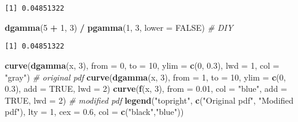\documentclass[]{book}
\newenvironment{Shaded}{\begin{snugshade}}{\end{snugshade}}
\newcommand{\KeywordTok}[1]{\textcolor[rgb]{0.13,0.29,0.53}{\textbf{#1}}}
\newcommand{\DataTypeTok}[1]{\textcolor[rgb]{0.13,0.29,0.53}{#1}}
\newcommand{\DecValTok}[1]{\textcolor[rgb]{0.00,0.00,0.81}{#1}}
\newcommand{\FloatTok}[1]{\textcolor[rgb]{0.00,0.00,0.81}{#1}}
\newcommand{\StringTok}[1]{\textcolor[rgb]{0.31,0.60,0.02}{#1}}
\newcommand{\CommentTok}[1]{\textcolor[rgb]{0.56,0.35,0.01}{\textit{#1}}}
\newcommand{\OtherTok}[1]{\textcolor[rgb]{0.56,0.35,0.01}{#1}}
\newcommand{\OperatorTok}[1]{\textcolor[rgb]{0.81,0.36,0.00}{\textbf{#1}}}
\newcommand{\NormalTok}[1]{#1}
\theoremstyle{definition}
\theoremstyle{definition}
\theoremstyle{definition}
\theoremstyle{remark}
\begin{document}
\begin{verbatim}
[1] 0.04851322
\end{verbatim}

\begin{Shaded}
\begin{Highlighting}[]
\KeywordTok{dgamma}\NormalTok{(}\DecValTok{5} \OperatorTok{+}\StringTok{ }\DecValTok{1}\NormalTok{, }\DecValTok{3}\NormalTok{) }\OperatorTok{/}\StringTok{ }\KeywordTok{pgamma}\NormalTok{(}\DecValTok{1}\NormalTok{, }\DecValTok{3}\NormalTok{, }\DataTypeTok{lower =} \OtherTok{FALSE}\NormalTok{)  }\CommentTok{# DIY}
\end{Highlighting}
\end{Shaded}

\begin{verbatim}
[1] 0.04851322
\end{verbatim}

\begin{Shaded}
\begin{Highlighting}[]
\KeywordTok{curve}\NormalTok{(}\KeywordTok{dgamma}\NormalTok{(x, }\DecValTok{3}\NormalTok{), }\DataTypeTok{from =} \DecValTok{0}\NormalTok{, }\DataTypeTok{to =} \DecValTok{10}\NormalTok{, }\DataTypeTok{ylim =} \KeywordTok{c}\NormalTok{(}\DecValTok{0}\NormalTok{, }\FloatTok{0.3}\NormalTok{), }
      \DataTypeTok{lwd =} \DecValTok{1}\NormalTok{, }\DataTypeTok{col =} \StringTok{"gray"}\NormalTok{)  }\CommentTok{# original pdf}
\KeywordTok{curve}\NormalTok{(}\KeywordTok{dgamma}\NormalTok{(x, }\DecValTok{3}\NormalTok{), }\DataTypeTok{from =} \DecValTok{1}\NormalTok{, }\DataTypeTok{to =} \DecValTok{10}\NormalTok{, }\DataTypeTok{ylim =} \KeywordTok{c}\NormalTok{(}\DecValTok{0}\NormalTok{, }\FloatTok{0.3}\NormalTok{), }\DataTypeTok{add =} \OtherTok{TRUE}\NormalTok{, }\DataTypeTok{lwd =} \DecValTok{2}\NormalTok{) }
\KeywordTok{curve}\NormalTok{(}\KeywordTok{f}\NormalTok{(x, }\DecValTok{3}\NormalTok{), }\DataTypeTok{from =} \FloatTok{0.01}\NormalTok{, }\DataTypeTok{col =} \StringTok{"blue"}\NormalTok{, }
      \DataTypeTok{add =} \OtherTok{TRUE}\NormalTok{, }\DataTypeTok{lwd =} \DecValTok{2}\NormalTok{)     }\CommentTok{# modified pdf}
\KeywordTok{legend}\NormalTok{(}\StringTok{"topright"}\NormalTok{, }\KeywordTok{c}\NormalTok{(}\StringTok{"Original pdf"}\NormalTok{, }\StringTok{"Modified pdf"}\NormalTok{), }
       \DataTypeTok{lty =} \DecValTok{1}\NormalTok{, }\DataTypeTok{cex =} \FloatTok{0.6}\NormalTok{, }\DataTypeTok{col =} \KeywordTok{c}\NormalTok{(}\StringTok{"black"}\NormalTok{,}\StringTok{"blue"}\NormalTok{))}
\end{Highlighting}
\end{Shaded}
\end{document}
